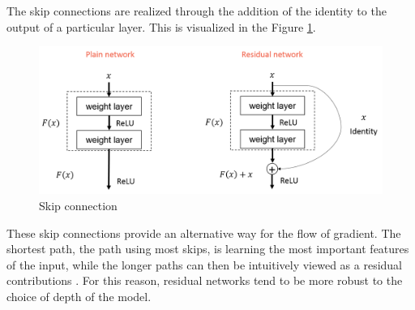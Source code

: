 The skip connections are realized through the addition of the identity to the output of a particular layer.
This is visualized in the Figure \ref{fig:skip_connection}.
\begin{figure}
    \centering
    \includegraphics[width=\linewidth]{imgs_andy/skip_connection.png}
    \caption{Skip connection}
    \label{fig:skip_connection}
\end{figure}
These skip connections provide an alternative way for the flow of gradient.
The shortest path, the path using most skips, is learning the most important features of the input, while the longer paths can then be intuitively viewed as a residual contributions \cite{he2016deep}.
For this reason, residual networks tend to be more robust to the choice of depth of the model.
    

\newpage